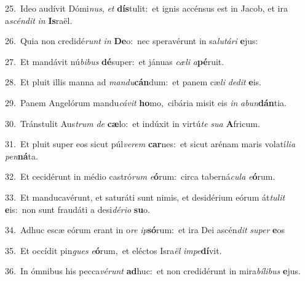 {\numbfont\textcolor{\numbcolor}{25.}}~Ideo audívit Dómi\-\textit{nus}\-, \textit{et} \textbf{dís}\-tulit:~\star et ignis accénsus est in Jacob, et ira a\-\textit{scén}\-\textit{dit} \textit{in} \textbf{Is}\-raël.\par
{\numbfont\textcolor{\numbcolor}{26.}}~Quia non credidé\textit{runt} \textit{in} \textbf{De}\-o:~\star nec speravérunt in sa\-\textit{lu}\-\textit{tá}\textit{ri} \textbf{e}\-jus:\par
{\numbfont\textcolor{\numbcolor}{27.}}~Et mandávit nú\-\textit{bi}\-\textit{bus} \textbf{dé}\-super:~\star et jánuas \textit{cæ}\-\textit{li} \textit{a}\-\textbf{pé}ruit.\par
{\numbfont\textcolor{\numbcolor}{28.}}~Et pluit illis manna ad \textit{man}\-\textit{du}\textbf{cán}dum:~\star et panem cæ\textit{li} \textit{de}\-\textit{dit} \textbf{e}\-is.\par
{\numbfont\textcolor{\numbcolor}{29.}}~Panem Angelórum mandu\-\textit{cá}\-\textit{vit} \textbf{ho}\-mo,~\star cibária misit eis \textit{in} \textit{ab}\-\textit{un}\textbf{dán}tia.\par
{\numbfont\textcolor{\numbcolor}{30.}}~Tránstulit Aus\textit{trum} \textit{de} \textbf{cæ}\-lo:~\star et indúxit in virtú\textit{te} \textit{su}\-\textit{a} \textbf{A}\-fricum.\par
{\numbfont\textcolor{\numbcolor}{31.}}~Et pluit super eos sicut púl\-\textit{ve}\-\textit{rem} \textbf{car}\-nes:~\star et sicut arénam maris volatí\-\textit{li}\-\textit{a} \textit{pen}\-\textbf{ná}ta.\par
{\numbfont\textcolor{\numbcolor}{32.}}~Et cecidérunt in médio castró\textit{rum} \textit{e}\-\textbf{ó}rum:~\star circa taberná\-\textit{cu}\-\textit{la} \textit{e}\-\textbf{ó}rum.\par
{\numbfont\textcolor{\numbcolor}{33.}}~Et manducavérunt, et saturáti sunt nimis, et desidérium eórum át\-\textit{tu}\-\textit{lit} \textbf{e}\-is:~\star non sunt fraudáti a desi\-\textit{dé}\-\textit{ri}\textit{o} \textbf{su}\-o.\par
{\numbfont\textcolor{\numbcolor}{34.}}~Adhuc escæ eórum erant in o\textit{re} \textit{ip}\-\textbf{só}rum:~\star et ira Dei ascén\textit{dit} \textit{su}\-\textit{per} \textbf{e}\-os\par
{\numbfont\textcolor{\numbcolor}{35.}}~Et occídit pin\textit{gues} \textit{e}\-\textbf{ó}rum,~\star et eléctos Isra\textit{ël} \textit{im}\-\textit{pe}\textbf{dí}vit.\par
{\numbfont\textcolor{\numbcolor}{36.}}~In ómnibus his pecca\-\textit{vé}\-\textit{runt} \textbf{ad}\-huc:~\star et non credidérunt in mira\-\textit{bí}\-\textit{li}\textit{bus} \textbf{e}\-jus.\par
